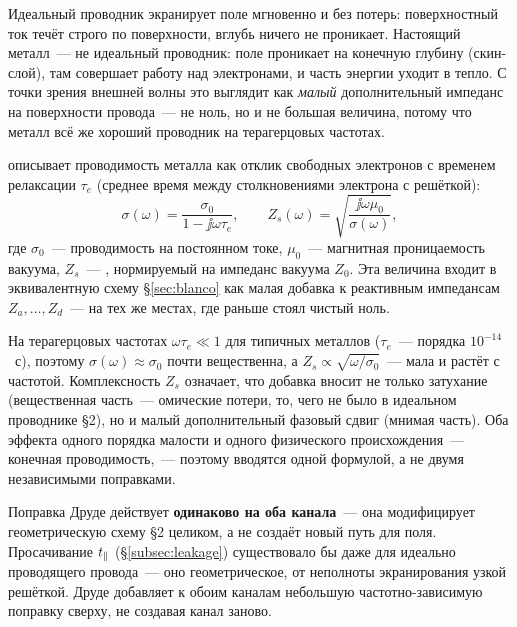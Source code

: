 \begin{intuition}
Идеальный проводник экранирует поле мгновенно и без потерь: поверхностный ток течёт строго по
поверхности, вглубь ничего не проникает. Настоящий металл~--- не идеальный проводник: поле
проникает на конечную глубину (скин-слой), там совершает работу над электронами, и часть энергии
уходит в тепло. С точки зрения внешней волны это выглядит как \emph{малый} дополнительный
импеданс на поверхности провода~--- не ноль, но и не большая величина, потому что металл всё же
хороший проводник на терагерцовых частотах.
\end{intuition}

\noindent
{} описывает проводимость металла как отклик свободных электронов с временем
релаксации $\tau_e$ (среднее время между столкновениями электрона с решёткой):
\begin{equation}
  \sigma(\omega)=\frac{\sigma_0}{1-\jj\omega\tau_e},
  \qquad
  Z_s(\omega)=\sqrt{\frac{\jj\omega\mu_0}{\sigma(\omega)}},
  \label{eq:drude}
\end{equation}
где $\sigma_0$~--- проводимость на постоянном токе, $\mu_0$~--- магнитная проницаемость вакуума,
$Z_s$~--- , нормируемый на импеданс вакуума $Z_0$. Эта величина
входит в эквивалентную схему §\ref{sec:blanco} как малая добавка к реактивным импедансам
$Z_a,\ldots,Z_d$~--- на тех же местах, где раньше стоял чистый ноль.

\begin{strict}
На терагерцовых частотах $\omega\tau_e\ll1$ для типичных металлов ($\tau_e$~--- порядка
$10^{-14}$~с), поэтому $\sigma(\omega)\approx\sigma_0$ почти вещественна, а
$Z_s\propto\sqrt{\omega/\sigma_0}$~--- мала и растёт с частотой. Комплексность $Z_s$ означает, что
добавка вносит не только затухание (вещественная часть~--- омические потери, то, чего не было в
идеальном проводнике §2), но и малый дополнительный фазовый сдвиг (мнимая часть). Оба эффекта
одного порядка малости и одного физического происхождения~--- конечная проводимость,~--- поэтому
вводятся одной формулой, а не двумя независимыми поправками.
\end{strict}

\begin{warning}
Поправка Друде действует \textbf{одинаково на оба канала}~--- она модифицирует геометрическую
схему §2 целиком, а не создаёт новый путь для поля. Просачивание $t_{\parallel}$ (§\ref{subsec:leakage})
существовало бы даже для идеально проводящего провода~--- оно геометрическое, от неполноты
экранирования узкой решёткой. Друде добавляет к обоим каналам небольшую частотно-зависимую
поправку сверху, не создавая канал заново.
\end{warning}


